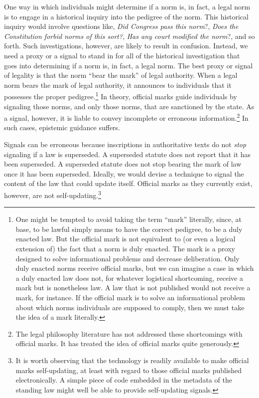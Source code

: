 One way in which individuals might determine if a norm is, in fact, a
legal norm is to engage in a historical inquiry into the pedigree of the
norm. This historical inquiry would involve questions like, \emph{Did
Congress pass this norm}?, \emph{Does the Constitution forbid norms of
this sort?}, \emph{Has any court modified the norm}?, and so forth. Such
investigations, however, are likely to result in confusion. Instead, we
need a proxy or a signal to stand in for all of the historical
investigation that goes into determining if a norm is, in fact, a legal
norm. The best proxy or signal of legality is that the norm ``bear the
mark'' of legal authority. When a legal norm bears the mark of legal
authority, it announces to individuals that it possesses the proper
pedigree.\footnote{One might be tempted to avoid taking the term
  ``mark'' literally, since, at base, to be lawful simply means to have
  the correct pedigree, to be a duly enacted law. But the official mark
  is not equivalent to (or even a logical extension of) the fact that a
  norm is duly enacted. The mark is a proxy designed to solve
  informational problems and decrease deliberation. Only duly enacted
  norms receive official marks, but we can imagine a case in which a
  duly enacted law does not, for whatever logistical shortcoming,
  receive a mark but is nonetheless law. A law that is not published
  would not receive a mark, for instance. If the official mark is to
  solve an informational problem about which norms individuals are
  supposed to comply, then we must take the idea of a mark literally.}
In theory, official marks guide individuals by signaling those norms,
and only those norms, that are sanctioned by the state. As a signal,
however, it is liable to convey incomplete or erroneous
information.\footnote{The legal philosophy literature has not addressed
  these shortcomings with official marks. It has treated the idea of
  official marks quite generously.} In such cases, epistemic guidance
suffers.

Signals can be erroneous because inscriptions in authoritative texts do
not \emph{stop} signaling if a law is superseded. A superseded statute
does not report that it has been superseded. A superseded statute does
not stop bearing the mark of law once it has been superseded. Ideally,
we would devise a technique to signal the content of the law that could
update itself. Official marks as they currently exist, however, are not
self-updating.\footnote{It is worth observing that the technology is
  readily available to make official marks self-updating, at least with
  regard to those official marks published electronically. A simple
  piece of code embedded in the metadata of the standing law might well
  be able to provide self-updating signals.}

